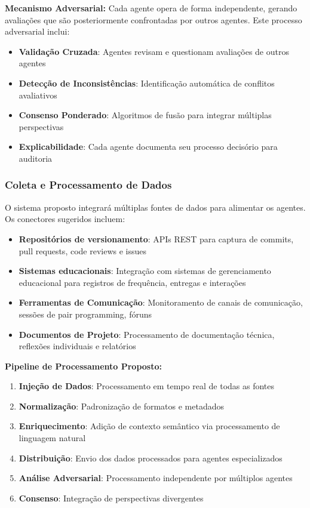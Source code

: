 \documentclass[english, spanish, brazilian]{modelo_dt}
\begin{document}
\textbf{Mecanismo Adversarial:}
Cada agente opera de forma independente, gerando avaliações que são posteriormente confrontadas por outros agentes. Este processo adversarial inclui:

\begin{itemize}
\item \textbf{Validação Cruzada}: Agentes revisam e questionam avaliações de outros agentes
\item \textbf{Detecção de Inconsistências}: Identificação automática de conflitos avaliativos
\item \textbf{Consenso Ponderado}: Algoritmos de fusão para integrar múltiplas perspectivas
\item \textbf{Explicabilidade}: Cada agente documenta seu processo decisório para auditoria
\end{itemize}

\subsubsection{Coleta e Processamento de Dados}

O sistema proposto integrará múltiplas fontes de dados para alimentar os agentes. Os conectores sugeridos incluem:

\begin{itemize}
\item \textbf{Repositórios de versionamento}: APIs REST para captura de commits, pull requests, code reviews e issues
\item \textbf{Sistemas educacionais}: Integração com sistemas de gerenciamento educacional para registros de frequência, entregas e interações
\item \textbf{Ferramentas de Comunicação}: Monitoramento de canais de comunicação, sessões de pair programming, fóruns
\item \textbf{Documentos de Projeto}: Processamento de documentação técnica, reflexões individuais e relatórios
\end{itemize}

\textbf{Pipeline de Processamento Proposto:}
\begin{enumerate}
\item \textbf{Injeção de Dados}: Processamento em tempo real de todas as fontes
\item \textbf{Normalização}: Padronização de formatos e metadados
\item \textbf{Enriquecimento}: Adição de contexto semântico via processamento de linguagem natural
\item \textbf{Distribuição}: Envio dos dados processados para agentes especializados
\item \textbf{Análise Adversarial}: Processamento independente por múltiplos agentes
\item \textbf{Consenso}: Integração de perspectivas divergentes
\end{enumerate}
\end{document}
